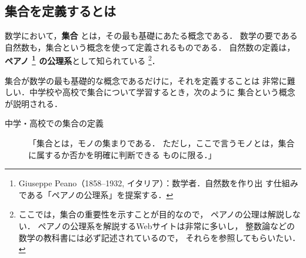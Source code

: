             \subsection{集合を定義するとは}
                数学において，\textbf{集合} とは，その最も基礎にあたる概念である．
                数学の要である自然数も，集合という概念を使って定義されるものである．
                自然数の定義は，\textbf{ペアノ
                    \footnote{
                        Giuseppe Peano（1858--1932, イタリア）：数学者．自然数を作り出
                        す仕組みである「ペアノの公理系」を提案する．
                    }
                の公理系}として知られている
                    \footnote{
                        ここでは，集合の重要性を示すことが目的なので，
                        ペアノの公理は解説しない．
                        ペアノの公理系を解説するWebサイトは非常に多いし，
                        整数論などの数学の教科書には必ず記述されているので，
                        それらを参照してもらいたい．
                    }．

                集合が数学の最も基礎的な概念であるだけに，それを定義することは
                非常に難しい．中学校や高校で集合について学習するとき，次のように
                集合という概念が説明される．
                    \begin{description}
                        \item[中学・高校での集合の定義] 「集合とは，モノの集まりである．
                        ただし，ここで言うモノとは，集合に属するか否かを明確に判断できる
                        ものに限る．」
                    \end{description}

